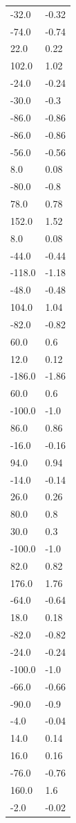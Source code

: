 \begin{longtable}{ll}
-32.0 & -0.32 \\
-74.0 & -0.74 \\
22.0 & 0.22 \\
102.0 & 1.02 \\
-24.0 & -0.24 \\
-30.0 & -0.3 \\
-86.0 & -0.86 \\
-86.0 & -0.86 \\
-56.0 & -0.56 \\
8.0 & 0.08 \\
-80.0 & -0.8 \\
78.0 & 0.78 \\
152.0 & 1.52 \\
8.0 & 0.08 \\
-44.0 & -0.44 \\
-118.0 & -1.18 \\
-48.0 & -0.48 \\
104.0 & 1.04 \\
-82.0 & -0.82 \\
60.0 & 0.6 \\
12.0 & 0.12 \\
-186.0 & -1.86 \\
60.0 & 0.6 \\
-100.0 & -1.0 \\
86.0 & 0.86 \\
-16.0 & -0.16 \\
94.0 & 0.94 \\
-14.0 & -0.14 \\
26.0 & 0.26 \\
80.0 & 0.8 \\
30.0 & 0.3 \\
-100.0 & -1.0 \\
82.0 & 0.82 \\
176.0 & 1.76 \\
-64.0 & -0.64 \\
18.0 & 0.18 \\
-82.0 & -0.82 \\
-24.0 & -0.24 \\
-100.0 & -1.0 \\
-66.0 & -0.66 \\
-90.0 & -0.9 \\
-4.0 & -0.04 \\
14.0 & 0.14 \\
16.0 & 0.16 \\
-76.0 & -0.76 \\
160.0 & 1.6 \\
-2.0 & -0.02 \\

\end{longtable}

